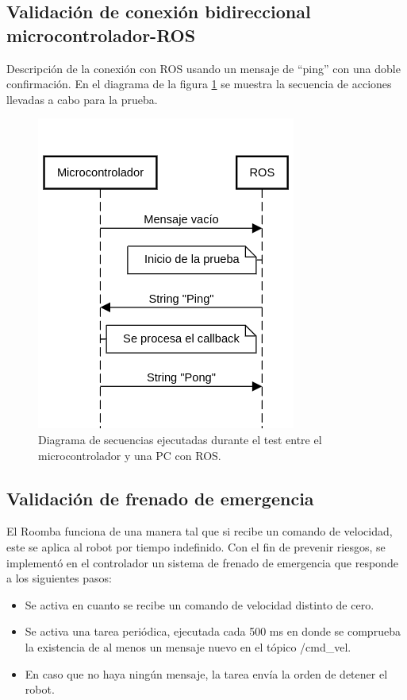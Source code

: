 \subsection{Validación de conexión bidireccional microcontrolador-ROS}

Descripción de la conexión con ROS usando un mensaje de ``ping'' con una doble confirmación. En el diagrama de la figura \ref{fig:secMicroROS} se muestra la secuencia de acciones llevadas a cabo para la prueba.

\begin{figure}[ht]
    \centering
    \includegraphics[scale=0.6]{./Figures/comm_test1.png}
    \caption{Diagrama de secuencias ejecutadas durante el test entre el microcontrolador y una PC con ROS.}
    \label{fig:secMicroROS}
\end{figure}

\subsection{Validación de frenado de emergencia}

El Roomba funciona de una manera tal que si recibe un comando de velocidad, este se aplica al robot por tiempo indefinido. Con el fin de prevenir riesgos, se implementó en el controlador un sistema de frenado de emergencia que responde a los siguientes pasos:

\begin{itemize}
    \item Se activa en cuanto se recibe un comando de velocidad distinto de cero.
    \item Se activa una tarea periódica, ejecutada cada 500 ms en donde se comprueba la existencia de al menos un mensaje nuevo en el tópico /cmd\_vel.
    \item En caso que no haya ningún mensaje, la tarea envía la orden de detener el robot.
\end{itemize}


